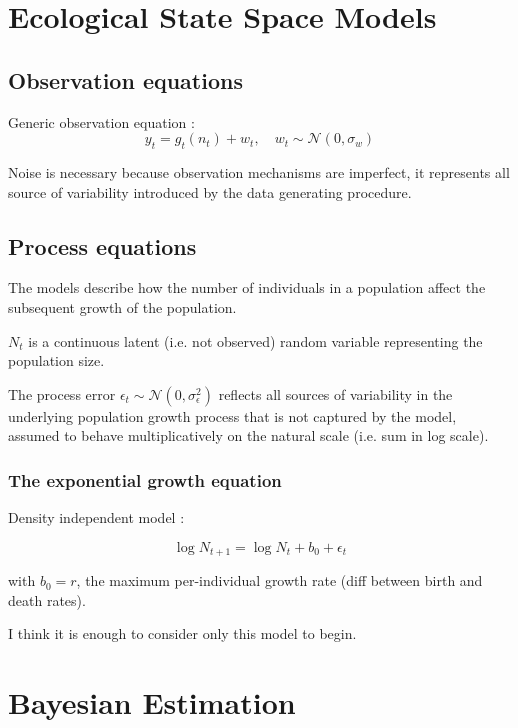 \documentclass[10pt,a4paper]{article}
\begin{document}
\section{Ecological State Space Models}

\subsection{Observation equations}

Generic observation equation : 
\begin{equation}
y_t = g_t(n_t) + w_t, \quad w_t \sim \mathcal{N}(0, \sigma_w)
\end{equation}

Noise is necessary because observation mechanisms are imperfect, it represents all source of variability introduced by the data generating procedure.

\subsection{Process equations}

The models describe how the number of individuals in a population affect the subsequent growth of the population.

$N_t$ is a continuous latent (i.e. not observed) random variable representing the population size.

The process error $\epsilon_t \sim \mathcal{N}(0, \sigma_\epsilon^2)$ reflects all sources of variability in the underlying population growth process that is not captured by the model, assumed to behave multiplicatively on the natural scale (i.e. sum in log scale).

\subsubsection{The exponential growth equation}

Density independent model :

\begin{equation}
\log N_{t+1} = \log N_t + b_0 + \epsilon_t
\end{equation}

with $b_0 = r$, the maximum per-individual growth rate (diff between birth and death rates). 

I think it is enough to consider only this model to begin.

\section{Bayesian Estimation}
\end{document}
